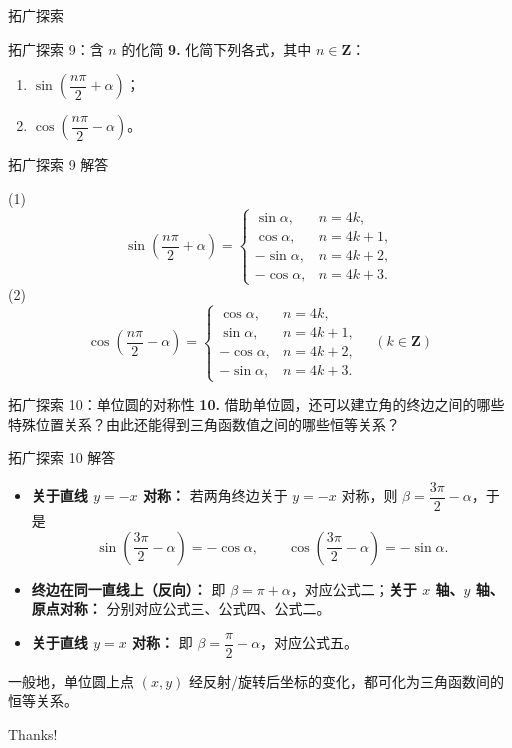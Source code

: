 \documentclass[10pt,aspectratio=169,serif]{beamer}
\begin{document}
\begin{frame}[c]\Huge\centering 拓广探索\end{frame}

\begin{frame}[t]{拓广探索 9：含 $n$ 的化简}
\textbf{9.} 化简下列各式，其中 $n\in\mathbf Z$：
\begin{enumerate}[(1)]
  \item $\sin\!\left(\dfrac{n\pi}{2}+\alpha\right)$； \qquad
  \item $\cos\!\left(\dfrac{n\pi}{2}-\alpha\right)$。
\end{enumerate}
\end{frame}

\begin{frame}[t]{拓广探索 9 解答}
\begin{tcolorbox}[colback=orange!10,colframe=orange,title=\textbf{解：按 $n$ 被 $4$ 除的余数分类}]
(1)
\[
\sin\!\left(\frac{n\pi}{2}+\alpha\right)=
\begin{cases}
\sin\alpha, & n=4k,\\
\cos\alpha, & n=4k+1,\\
-\sin\alpha, & n=4k+2,\\
-\cos\alpha, & n=4k+3.
\end{cases}
\]
(2)
\[
\cos\!\left(\frac{n\pi}{2}-\alpha\right)=
\begin{cases}
\cos\alpha, & n=4k,\\
\sin\alpha, & n=4k+1,\\
-\cos\alpha, & n=4k+2,\\
-\sin\alpha, & n=4k+3.
\end{cases}\quad(k\in\mathbf Z)
\]
\end{tcolorbox}
\end{frame}

\begin{frame}[t]{拓广探索 10：单位圆的对称性}
\textbf{10.} 借助单位圆，还可以建立角的终边之间的哪些特殊位置关系？由此还能得到三角函数值之间的哪些恒等关系？
\end{frame}

\begin{frame}[t]{拓广探索 10 解答}
\begin{tcolorbox}[colback=orange!10,colframe=orange,title=\textbf{参考结论}]
\begin{itemize}
  \item \textbf{关于直线 $y=-x$ 对称：} 若两角终边关于 $y=-x$ 对称，则 $\beta=\dfrac{3\pi}{2}-\alpha$，于是
  \[
  \sin\!\left(\frac{3\pi}{2}-\alpha\right)=-\cos\alpha,\qquad
  \cos\!\left(\frac{3\pi}{2}-\alpha\right)=-\sin\alpha.
  \]
  \item \textbf{终边在同一直线上（反向）：} 即 $\beta=\pi+\alpha$，对应公式二；\textbf{关于 $x$ 轴、$y$ 轴、原点对称：} 分别对应公式三、公式四、公式二。
  \item \textbf{关于直线 $y=x$ 对称：} 即 $\beta=\dfrac{\pi}{2}-\alpha$，对应公式五。
\end{itemize}
\small 一般地，单位圆上点 $(x,y)$ 经反射/旋转后坐标的变化，都可化为三角函数间的恒等关系。
\end{tcolorbox}
\end{frame}

\begin{frame}[c]
  \begin{center}
    {\Huge\calligra Thanks!}
  \end{center}
\end{frame}
\end{document}
